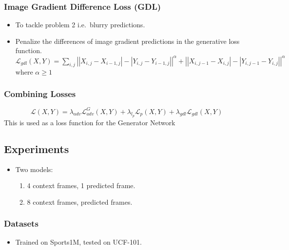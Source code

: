 \documentclass{article}
\begin{document}
    \subsubsection{Image Gradient Difference Loss (GDL)}\label{subsubsec:Deep_Multi_Scale_Video_Prediction_Beyond_Mean_Square_Error:image-gradient-difference-lossgdl}
    \begin{itemize}
        \item To tackle problem 2 i.e.\ blurry predictions.
        \item Penalize the differences of image gradient predictions in the generative loss function. \\
        $\mathcal{L}_{gdl}(X,Y) = \sum_{i,j} \left| \left| X_{i,j} - X_{i-1,j} \right| - \left| Y_{i,j} - Y_{i-1,j} \right| \right|^\alpha + \left| \left| X_{i,j-1} - X_{i,j} \right| - \left| Y_{i,j-1} - Y_{i,j} \right| \right|^\alpha $ \\
        where $\alpha \geq 1$
    \end{itemize}

    \subsubsection{Combining Losses}\label{subsubsec:Deep_Multi_Scale_Video_Prediction_Beyond_Mean_Square_Error:combining-losses}
    \begin{equation*}
        \mathscr{L}(X,Y) = \lambda_{adv} \mathscr{L}_{adv}^G(X,Y) + \lambda_{l_p} \mathscr{L}_p(X,Y) + \lambda_{gdl} \mathscr{L}_{gdl}(X,Y)
    \end{equation*}
    This is used as a loss function for the Generator Network

    \subsection{Experiments}\label{subsec:Deep_Multi_Scale_Video_Prediction_Beyond_Mean_Square_Error:experiments}
    \begin{itemize}
        \item Two models:
        \begin{enumerate}
            \item 4 context frames, 1 predicted frame.
            \item 8 context frames, predicted frames.
        \end{enumerate}
    \end{itemize}

    \subsubsection{Datasets}\label{subsubsec:Deep_Multi_Scale_Video_Prediction_Beyond_Mean_Square_Error:datasets}
    \begin{itemize}
        \item Trained on Sports1M, tested on UCF-101.
    \end{itemize}
\end{document}
